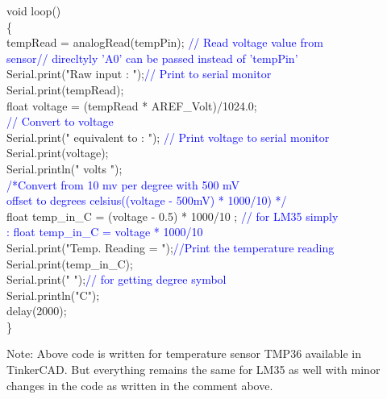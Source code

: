 \documentclass[12pt,a4paper]{article}
\begin{document}
void loop() \\
\{  \\                  
  tempRead = analogRead(tempPin); \hspace{12pt}\textcolor{blue}{// Read voltage value from\\ sensor// direcltyly 'A0' can be passed instead of 'tempPin'}\\
  Serial.print("Raw input : ");\hspace{12pt}\textcolor{blue}{// Print to serial monitor}\\
  Serial.print(tempRead); \\
  float voltage = (tempRead * AREF\_Volt)/1024.0;\\ \hspace{12pt}\textcolor{blue}{// Convert to voltage}\\
  Serial.print(" equivalent to : ");\hspace{12pt}\textcolor{blue}{ // Print voltage to serial monitor}\\
  Serial.print(voltage);\\
  Serial.println(" volts ");\\

  \textcolor{blue}{/*Convert from 10 mv per degree with 500 mV \\offset
  to degrees celsius((voltage - 500mV) * 1000/10) */ }\\

  float temp\_in\_C = (voltage - 0.5) * 1000/10 ; 
  \textcolor{blue}{// for LM35 simply \\: float temp\_in\_C = voltage * 1000/10} \\
  
  Serial.print("Temp. Reading = ");\hspace{12pt}\textcolor{blue}{//Print the temperature reading} \\
  
  Serial.print(temp\_in\_C);\\
  
  Serial.print(" ");\hspace{12pt}\textcolor{blue}{// for getting degree symbol}\\
  
 Serial.println("C\n");\\
 
  delay(2000);\\
\}

\noindent Note: Above code is written for  temperature sensor TMP36 available in TinkerCAD. But everything remains the same for LM35 as well with minor changes in the code as written in the comment above.
\vspace{20mm}
\end{document}
